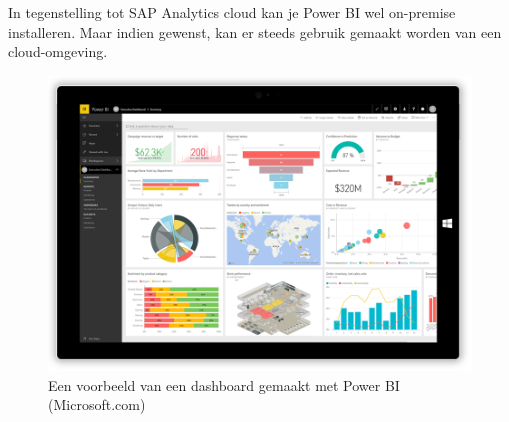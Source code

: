 In tegenstelling tot SAP Analytics cloud kan je Power BI wel on-premise installeren. Maar indien gewenst, kan er steeds gebruik gemaakt worden van een cloud-omgeving.

\begin{figure}[h]
	\centering
	\includegraphics[scale=0.45]{../images/powerbi.png}
	\caption{Een voorbeeld van een dashboard gemaakt met Power BI (Microsoft.com)}
	\label{fig:powerbi}
\end{figure}
 





